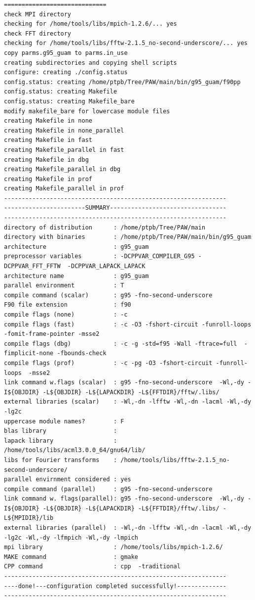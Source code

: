 \documentclass[a4paper,10pt]{report}
\begin{document}
\begin{verbatim}
=============================
check MPI directory
checking for /home/tools/libs/mpich-1.2.6/... yes
check FFT directory
checking for /home/tools/libs/fftw-2.1.5_no-second-underscore/... yes
copy parms.g95_guam to parms.in_use
creating subdirectories and copying shell scripts
configure: creating ./config.status
config.status: creating /home/ptpb/Tree/PAW/main/bin/g95_guam/f90pp
config.status: creating Makefile
config.status: creating Makefile_bare
modify makefile_bare for lowercase module files
creating Makefile in none
creating Makefile in none_parallel
creating Makefile in fast
creating Makefile_parallel in fast
creating Makefile in dbg
creating Makefile_parallel in dbg
creating Makefile in prof
creating Makefile_parallel in prof
---------------------------------------------------------------
-----------------------SUMMARY---------------------------------
---------------------------------------------------------------
directory of distribution      : /home/ptpb/Tree/PAW/main
directory with binaries        : /home/ptpb/Tree/PAW/main/bin/g95_guam
architecture                   : g95_guam
preprocessor variables         : -DCPPVAR_COMPILER_G95 -DCPPVAR_FFT_FFTW  -DCPPVAR_LAPACK_LAPACK
architecture name              : g95_guam
parallel environment           : T
compile command (scalar)       : g95 -fno-second-underscore
F90 file extension             : f90
compile flags (none)           : -c
compile flags (fast)           : -c -O3 -fshort-circuit -funroll-loops -fomit-frame-pointer -msse2
compile flags (dbg)            : -c -g -std=f95 -Wall -ftrace=full  -fimplicit-none -fbounds-check
compile flags (prof)           : -c -pg -O3 -fshort-circuit -funroll-loops  -msse2
link command w.flags (scalar)  : g95 -fno-second-underscore  -Wl,-dy -I${OBJDIR} -L${OBJDIR} -L${LAPACKDIR} -L${FFTDIR}/fftw/.libs/
external libraries (scalar)    : -Wl,-dn -lfftw -Wl,-dn -lacml -Wl,-dy -lg2c
uppercase module names?        : F
blas library                   :
lapack library                 : /home/tools/libs/acml3.0.0_64/gnu64/lib/
libs for Fourier transforms    : /home/tools/libs/fftw-2.1.5_no-second-underscore/
parallel envirnment considered : yes
compile command (parallel)     : g95 -fno-second-underscore
link command w. flags(parallel): g95 -fno-second-underscore  -Wl,-dy -I${OBJDIR} -L${OBJDIR} -L${LAPACKDIR} -L${FFTDIR}/fftw/.libs/ -L${MPIDIR}/lib
external libraries (parallel)  : -Wl,-dn -lfftw -Wl,-dn -lacml -Wl,-dy -lg2c -Wl,-dy -lfmpich -Wl,-dy -lmpich
mpi library                    : /home/tools/libs/mpich-1.2.6/
MAKE command                   : gmake
CPP command                    : cpp  -traditional
---------------------------------------------------------------
----done!---configuration completed successfully!--------------
---------------------------------------------------------------
\end{verbatim}
%
\newpage
\end{document}
